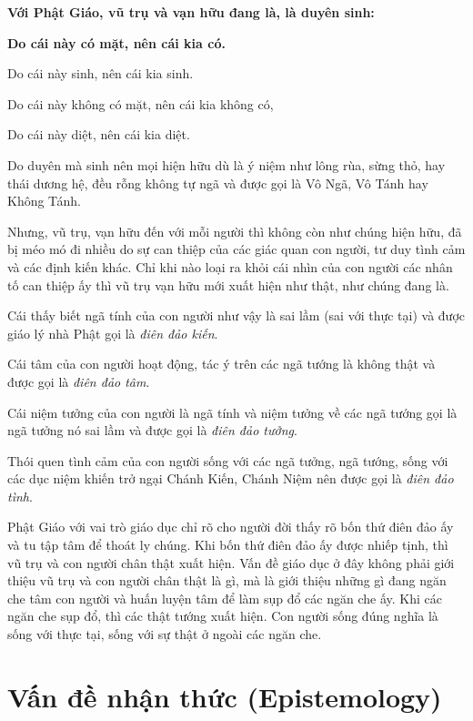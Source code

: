 \hrulefill

{\bf Với Phật Giáo, vũ trụ và vạn hữu đang là, là duyên sinh:}


{\bf Do cái này có mặt, nên cái kia có.

Do cái này sinh, nên cái kia sinh.

Do cái này không có mặt, nên cái kia không có,

Do cái này diệt, nên cái kia diệt.}

\hrulefill

Do duyên mà sinh nên mọi hiện hữu dù là ý niệm như lông rùa, sừng thỏ, hay thái dương hệ, đều rỗng không tự ngã và được gọi là Vô Ngã, Vô Tánh hay Không Tánh.

Nhưng, vũ trụ, vạn hữu đến với mỗi người thì không còn như chúng hiện hữu, đã bị méo mó đi nhiều do sự can thiệp của các giác quan con người, tư duy tình cảm và các định kiến khác. Chỉ khi nào loại ra khỏi cái nhìn của con người các nhân tố can thiệp ấy thì vũ trụ vạn hữu mới xuất hiện như thật, như chúng đang là.

Cái thấy biết ngã tính của con người như vậy là sai lầm (sai với thực tại) và được giáo lý nhà Phật gọi là \emph{điên đảo kiến}.

Cái tâm của con người hoạt động, tác ý trên các ngã tướng là không thật và được gọi là \emph{điên đảo tâm}.

Cái niệm tưởng của con người là ngã tính và niệm tưởng về các ngã tướng gọi là ngã tưởng nó sai lầm và được gọi là \emph{điên đảo tưởng}.

Thói quen tình cảm của con người sống với các ngã tưởng, ngã tướng, sống với các dục niệm khiến trở ngại Chánh Kiến, Chánh Niệm nên được gọi là \emph{điên đảo tình}.

Phật Giáo với vai trò giáo dục chỉ rõ cho người đời thấy rõ bốn thứ điên đảo ấy và tu tập tâm để thoát ly chúng. Khi bốn thứ điên đảo ấy được nhiếp tịnh, thì vũ trụ và con người chân thật xuất hiện. Vấn đề giáo dục ở đây không phải giới thiệu vũ trụ và con người chân thật là gì, mà là giới thiệu những gì đang ngăn che tâm con người và huấn luyện tâm để làm sụp đổ các ngăn che ấy. Khi các ngăn che sụp đổ, thì các thật tướng xuất hiện. Con người sống đúng nghĩa là sống với thực tại, sống với sự thật ở ngoài các ngăn che.


\section{Vấn đề nhận thức (Epistemology)} %
\label{sec:van_de_nhan_thuc}


